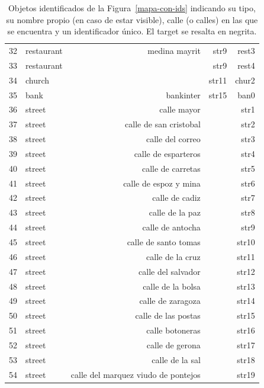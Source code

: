 \begin{table}[H]
{\begin{center}
\begin{tabular}{|l|l|r|r|r|}
32&restaurant & medina mayrit & str9 & rest3\\
33&restaurant & & str9 & rest4\\
34&church & & str11 & chur2\\
35&bank & bankinter & str15 & ban0\\
36&street & calle mayor & & str1 \\
37&street & calle de san cristobal & & str2\\
38&street & calle del correo & & str3\\
39&street & calle de esparteros & & str4\\
40&street & calle de carretas & & str5\\
41&street & calle de espoz y mina & & str6\\
42&street & calle de cadiz & & str7\\
43&street & calle de la paz & & str8\\
44&street & calle de antocha & & str9\\
45&street & calle de santo tomas & & str10\\
46&street & calle de la cruz & & str11\\
47&street & calle del salvador & & str12\\
48&street & calle de la bolsa & & str13\\
49&street & calle de zaragoza & & str14\\
50&street & calle de las postas & & str15\\
51&street & calle botoneras & & str16\\
52&street & calle de gerona & & str17\\
53&street & calle de la sal & & str18\\
54&street & calle del marquez viudo de pontejos & & str19\\
\hline
\end{tabular}
\caption{Objetos identificados de la Figura~\ref{mapa-con-ids} indicando su tipo, su nombre propio (en caso de estar visible), calle (o calles) en las que se encuentra y un identificador \'unico. El target se resalta en negrita.\label{tabla-ids}}
\end{center}
}
\end{table}


